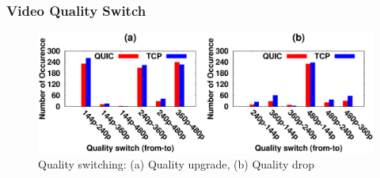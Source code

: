 \subsubsection{Video Quality Switch}
\begin{figure}[!t]
    \captionsetup[subfigure]{}
    \begin{center}
        \includegraphics[width=0.9\linewidth]{img/plotdata/metric/reschange_up_down}
        \caption{\label{fig:reschange}Quality switching: (a) Quality upgrade, (b) Quality drop}
    \end{center}
\end{figure}


